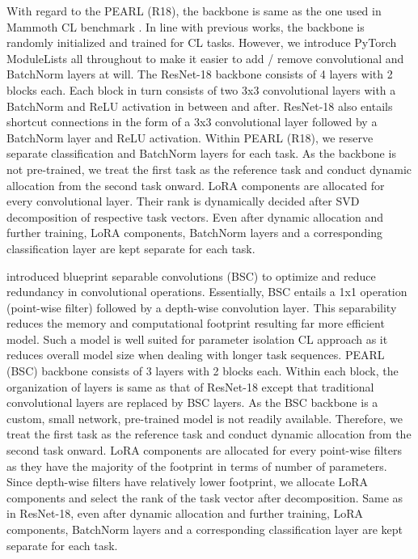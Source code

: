 \documentclass[10pt]{article} %
\begin{document}
 With regard to the PEARL (R18), the backbone is same as the one used in Mammoth CL benchmark \citep{buzzega2020dark}. In line with previous works, the backbone is randomly initialized and trained for CL tasks. However, we introduce PyTorch ModuleLists all throughout to make it easier to add / remove convolutional and BatchNorm layers at will. The ResNet-18 backbone consists of 4 layers with 2 blocks each. Each block in turn consists of two 3x3 convolutional layers with a BatchNorm and ReLU activation in between and after. ResNet-18 also entails shortcut connections in the form of a  3x3 convolutional layer followed by a BatchNorm layer and ReLU activation. Within PEARL (R18), we reserve separate classification and BatchNorm layers for each task.  As the backbone is not pre-trained, we treat the first task as  the reference task and conduct dynamic allocation from the second task onward. LoRA components are allocated for every convolutional layer. Their rank is dynamically decided after SVD decomposition of respective task vectors. Even after dynamic allocation and further training, LoRA components, BatchNorm layers and a corresponding classification layer are kept separate for each task.

 \citet{li2022blueprint} introduced blueprint separable convolutions (BSC) to  optimize and reduce redundancy in convolutional operations. Essentially, BSC entails a 1x1 operation (point-wise filter) followed by  a depth-wise convolution layer. This separability reduces the memory and computational footprint resulting far more efficient model. Such a model is well suited for parameter isolation CL approach as it reduces overall model size when dealing with longer task sequences. PEARL (BSC) backbone consists of  3 layers with 2 blocks each. Within each block, the organization of layers is same as that of ResNet-18 except that traditional convolutional layers are replaced by BSC layers. As the BSC backbone is a custom, small network, pre-trained model is not readily available. Therefore, we treat the first task as  the reference task and conduct dynamic allocation from the second task onward. LoRA components are allocated for every point-wise filters as they have the majority of the footprint in terms of number of parameters. Since depth-wise filters have relatively lower footprint, we allocate LoRA components and select the rank of the task vector after decomposition.  Same as in ResNet-18, even after dynamic allocation and further training, LoRA components, BatchNorm layers and a corresponding classification layer are kept separate for each task.
\end{document}
